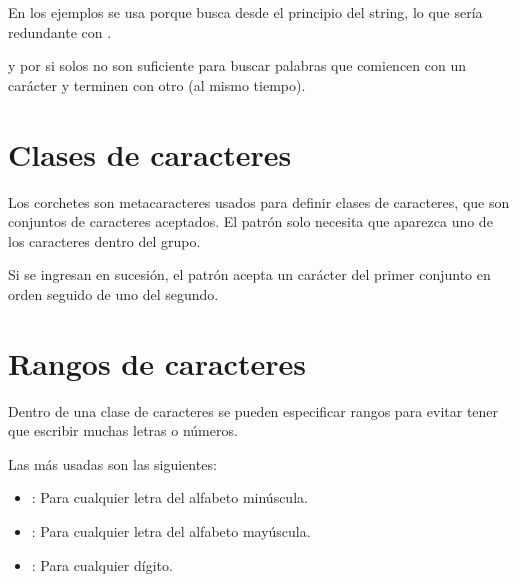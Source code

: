 En los ejemplos se usa  porque  busca desde el principio del string, lo que sería redundante con \ttt{\^}.


\ttt{\^} y \ttt{\$} por si solos no son suficiente para buscar palabras que comiencen con un carácter y terminen con otro (al mismo tiempo).

\section{Clases de caracteres}

Los corchetes \ttt{[]} son metacaracteres usados para definir clases de caracteres, que son conjuntos de caracteres aceptados.
El patrón solo necesita que aparezca uno de los caracteres dentro del grupo.


Si se ingresan en sucesión, el patrón acepta un carácter del primer conjunto en orden seguido de uno del segundo.


\section{Rangos de caracteres}

Dentro de una clase de caracteres se pueden especificar rangos para evitar tener que escribir muchas letras o números.

Las más usadas son las siguientes:

\begin{itemize}
    \item \ttt{[a-z]}: Para cualquier letra del alfabeto minúscula.
    
    \item \ttt{[A-Z]}: Para cualquier letra del alfabeto mayúscula.
    
    \item \ttt{[0-9]}: Para cualquier dígito.
    
\end{itemize}

